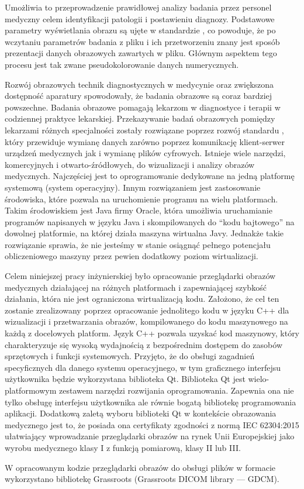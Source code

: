 Umożliwia to przeprowadzenie prawidłowej analizy badania przez personel medyczny celem identyfikacji patologii i postawieniu diagnozy.
Podstawowe parametry wyświetlania obrazu są ujęte w standardzie \DICOM, co powoduje, że po wczytaniu parametrów badania z pliku i ich przetworzeniu znany jest sposób prezentacji danych obrazowych zawartych w pliku.
Głównym aspektem tego procesu jest tak zwane pseudokolorowanie danych numerycznych. 
\par
Rozwój obrazowych technik diagnostycznych w medycynie oraz zwiększona dostępność aparatury spowodowały, że badania obrazowe są coraz bardziej powszechne. Badania obrazowe pomagają lekarzom w diagnostyce i terapii w codziennej praktyce lekarskiej.
Przekazywanie badań obrazowych pomiędzy lekarzami różnych specjalności zostały rozwiązane poprzez rozwój standardu \DICOM, który przewiduje wymianę danych zarówno poprzez komunikację klient-serwer urządzeń medycznych jak i wymianę plików cyfrowych. 
Istnieje wiele narzędzi, komercyjnych i otwarto-źródłowych, do wizualizacji i analizy obrazów medycznych.
Najczęściej jest to oprogramowanie dedykowane na jedną platformę systemową (system operacyjny).  
Innym rozwiązaniem jest zastosowanie środowiska, które pozwala na uruchomienie programu na wielu platformach. Takim środowiskiem jest Java firmy Oracle, która umożliwia uruchamianie programów napisanych w języku Java i skompilowanych do \enquote{kodu bajtowego} na dowolnej platformie, na której działa maszyna wirtualna Javy. Jednakże takie rozwiązanie sprawia, że nie jesteśmy w stanie osiągnąć pełnego potencjału obliczeniowego maszyny przez pewien dodatkowy poziom wirtualizacji.
\par
Celem niniejszej pracy inżynierskiej było opracowanie przeglądarki obrazów medycznych działającej na różnych platformach i zapewniającej szybkość działania, która nie jest ograniczona wirtualizacją kodu.
Założono, że cel ten zostanie zrealizowany poprzez opracowanie jednolitego kodu w języku C++ dla wizualizacji i przetwarzania obrazów, kompilowanego do kodu maszynowego na każdą z docelowych platform.
Język C++ pozwala uzyskać kod maszynowy, który charakteryzuje się wysoką wydajnością z bezpośrednim dostępem do zasobów sprzętowych i funkcji systemowych.
Przyjęto, że do obsługi zagadnień specyficznych dla danego systemu operacyjnego, w tym graficznego interfejsu użytkownika będzie wykorzystana biblioteka Qt.
Biblioteka Qt jest wielo-platformowym zestawem narzędzi rozwijania oprogramowania.
Zapewnia ona nie tylko obsługę interfejsu użytkownika ale równie bogatą bibliotekę programowania aplikacji.
Dodatkową zaletą wyboru biblioteki Qt w kontekście obrazowania medycznego jest to, że posiada ona certyfikaty zgodności z normą IEC 62304:2015 ułatwiający wprowadzanie przeglądarki obrazów na rynek Unii Europejskiej jako wyrobu medycznego klasy I z funkcją pomiarową, klasy II lub III.  
\par
W opracowanym kodzie przeglądarki obrazów do obsługi plików w formacie \DICOM wykorzystano bibliotekę Grassroots (Grassroots DICOM library --- GDCM).